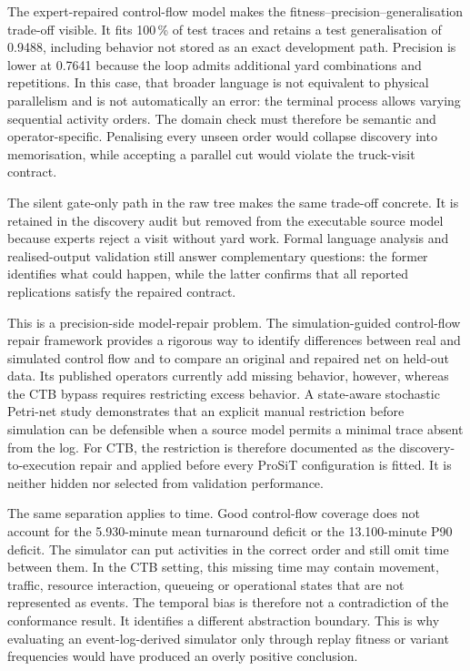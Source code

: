 The expert-repaired control-flow model makes the
fitness--precision--generalisation trade-off visible.
It fits 100\,\% of test traces and retains a test generalisation of
0.9488, including behavior not stored as an exact development path. Precision is
lower at 0.7641 because the loop admits additional yard combinations and
repetitions. In this case, that broader language is not equivalent to physical
parallelism and is not automatically an error: the terminal process allows
varying sequential activity orders. The domain check must therefore be
semantic and operator-specific. Penalising every unseen order would collapse
discovery into memorisation, while accepting a parallel cut would violate the
truck-visit contract.

The silent gate-only path in the raw tree makes the same trade-off concrete.
It is retained in the discovery audit but removed from the executable source
model because experts reject a visit without yard work. Formal language
analysis and realised-output validation still answer complementary questions:
the former identifies what could happen, while the latter confirms that all
reported replications satisfy the repaired contract.

This is a precision-side model-repair problem. The simulation-guided
control-flow repair framework \cite{SimulationGuidedRepair2025} provides a rigorous way to
identify differences between real and simulated control flow and to compare an
original and repaired net on held-out data. Its published operators currently
add missing behavior, however, whereas the CTB bypass requires restricting
excess behavior. A state-aware stochastic Petri-net study
\cite{Vinci2023Inf.Activ.Prob} demonstrates that an explicit manual restriction before simulation can be defensible when a
source model permits a minimal trace absent from the log. For CTB, the
restriction is therefore documented as the discovery-to-execution repair and
applied before every ProSiT configuration is fitted. It is neither hidden nor
selected from validation performance.

The same separation applies to time. Good control-flow coverage does not
account for the 5.930-minute mean turnaround deficit or the 13.100-minute P90
deficit. The simulator can put activities in the correct order and still omit
time between them. In the CTB setting, this missing time may contain movement,
traffic, resource interaction, queueing or operational states that are not
represented as events. The temporal bias is therefore not a contradiction of
the conformance result. It identifies a different abstraction boundary. This
is why evaluating an event-log-derived simulator only through replay fitness
or variant frequencies would have produced an overly positive conclusion.

